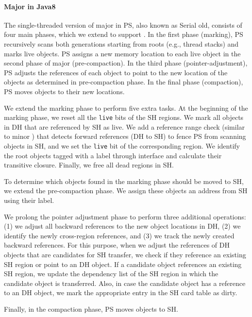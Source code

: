 \paragraph{\textbf{Major \teraheapGC in Java8}}
The single-threaded version of major \teraheapGC in PS, also known as Serial
old, consists of four main phases, which we extend to support \teraheapName{}.
In the first phase (marking), PS recursively scans both generations
starting from roots (e.g., thread stacks) and marks live objects. PS
assigns a new memory location to each live object in the second phase
of major \teraheapGC (pre-compaction). In the third phase
(pointer-adjustment), PS adjusts the references of each object to
point to the new location of the objects as determined in
pre-compaction phase. In the final phase (compaction), PS moves
objects to their new locations.

We extend the marking phase to perform five extra tasks. At the beginning of the
marking phase, we reset all the \texttt{live} bits of the SH regions. We mark
all objects in DH that are referenced by SH as live. We add a reference range
check (similar to minor \teraheapGC) that detects forward references (DH to SH) to fence
PS from scanning objects in SH, and we set the \texttt{live} bit of the
corresponding region. We identify the root objects tagged with a label through
\teraheapName{} interface and calculate their transitive closure. Finally, we free all
dead regions in SH.

To determine which objects found in the marking phase should be moved
to SH, we extend the pre-compaction phase. We assign these objects an
address from SH using their label.

We prolong the pointer adjustment phase to perform three additional
operations:
%
(1) we adjust all backward references to the new object locations in
DH,
%
(2) we identify the newly cross-region references, and
%
(3) we track the newly created backward references.
%
For this purpose, when we adjust the references of DH objects that are
candidates for SH transfer, we check if they reference an existing SH
region or point to an DH object. If a candidate object references an
existing SH region, we update the dependency list of the SH region in
which the candidate object is transferred. Also, in case the candidate
object has a reference to an DH object, we mark the appropriate entry
in the SH card table as dirty.

Finally, in the compaction phase, PS moves objects to SH.

